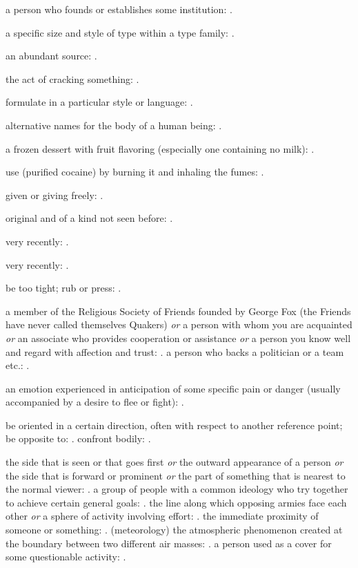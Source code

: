   a person who founds or establishes some institution: .

  a specific size and style of type within a type family: .

  an abundant source: .

  the act of cracking something: .

  formulate in a particular style or language: .

  alternative names for the body of a human being: .

  a frozen dessert with fruit flavoring (especially one containing no milk): .

  use (purified cocaine) by burning it and inhaling the fumes: .

  given or giving freely: .

  original and of a kind not seen before: .

  very recently: .

  very recently: .

  be too tight; rub or press: .

  a member of the Religious Society of Friends founded by George Fox (the Friends have never called themselves Quakers) \textit{or} a person with whom you are acquainted \textit{or} an associate who provides cooperation or assistance \textit{or} a person you know well and regard with affection and trust: . a person who backs a politician or a team etc.: .

  an emotion experienced in anticipation of some specific pain or danger (usually accompanied by a desire to flee or fight): .

  be oriented in a certain direction, often with respect to another reference point; be opposite to: . confront bodily: .

  the side that is seen or that goes first \textit{or} the outward appearance of a person \textit{or} the side that is forward or prominent \textit{or} the part of something that is nearest to the normal viewer: . a group of people with a common ideology who try together to achieve certain general goals: . the line along which opposing armies face each other \textit{or} a sphere of activity involving effort: . the immediate proximity of someone or something: . (meteorology) the atmospheric phenomenon created at the boundary between two different air masses: . a person used as a cover for some questionable activity: .

